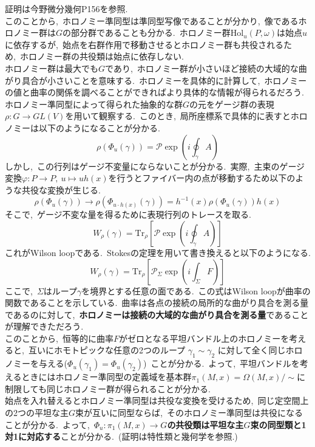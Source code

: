 \documentclass[uplatex,dvipdfmx]{jsarticle}
\begin{document}
証明は今野微分幾何P156を参照.\\
このことから,~ホロノミー準同型は準同型写像であることが分かり,~像であるホロノミー群は$G$の部分群であることも分かる.~ホロノミー群$\text{Hol}_u(P, \omega)$は始点$u$に依存するが,~始点を右群作用で移動させるとホロノミー群も共役されるため,~ホロノミー群の共役類は始点に依存しない.\\
ホロノミー群は最大でも$G$であり,~ホロノミー群が小さいほど接続の大域的な曲がり具合が小さいことを意味する.~ホロノミーを具体的に計算して,~ホロノミーの値と曲率の関係を調べることができればより具体的な情報が得られるだろう.\\
ホロノミー準同型によって得られた抽象的な群$G$の元をゲージ群の表現$\rho: G \to GL(V)$を用いて観察する.~このとき,~局所座標系で具体的に表すとホロノミーは以下のようになることが分かる.
\begin{equation}
    \rho(\Phi_u(\gamma)) = \mathcal{P} \exp \left( i \oint_\gamma A \right) 
\end{equation}
しかし,~この行列はゲージ不変量にならないことが分かる.~実際,~主束のゲージ変換$\varphi : P \to P,~ u \mapsto uh(x)$を行うとファイバー内の点が移動するため以下のような共役な変換が生じる.
\begin{equation}
    \rho(\Phi_{u}(\gamma)) \to \rho(\Phi_{u\cdot h(x)}(\gamma)) =  h^{-1}(x) \rho(\Phi_u(\gamma)) h(x)
\end{equation}
そこで,~ゲージ不変な量を得るために表現行列のトレースを取る.~
\begin{equation}
    W_\rho(\gamma)= \text{Tr}_\rho \left[ \mathcal{P} \exp \left( i \oint_\gamma A \right) \right]
\end{equation}
これがWilson loopである.~Stokesの定理を用いて書き換えると以下のようになる.
\begin{equation}
    W_\rho(\gamma) = \text{Tr}_\rho \left[ \mathcal{P}_\Sigma \exp \left( i \int_\Sigma F \right) \right]
\end{equation}
ここで,~$\Sigma$はループ$\gamma$を境界とする任意の面である.~この式はWilson loopが曲率の関数であることを示している.~曲率は各点の接続の局所的な曲がり具合を測る量であるのに対して,~\textbf{ホロノミーは接続の大域的な曲がり具合を測る量}であることが理解できただろう.\\
このことから,~恒等的に曲率$F$がゼロとなる平坦バンドル上のホロノミーを考えると,~互いにホモトピックな任意の2つのループ $\gamma_1 \sim \gamma_2$ に対して全く同じホロノミーを与える($\Phi_u(\gamma_1) = \Phi_u(\gamma_2)$)~ことが分かる.~よって,~平坦バンドルを考えるときにはホロノミー準同型の定義域を基本群$\pi_1(M, x) = \Omega(M, x)/\sim$に制限しても同じホロノミー群が得られることが分かる.\\
始点を入れ替えるとホロノミー準同型は共役な変換を受けるため,~同じ定空間上の2つの平坦な主$G$束が互いに同型ならば,~そのホロノミー準同型は共役になることが分かる.~よって,~\textbf{$\Phi_u : \pi_1(M, x) \to G$の共役類は平坦な主$G$束の同型類と1対1に対応する}ことが分かる.~(証明は特性類と幾何学を参照.)
\end{document}
